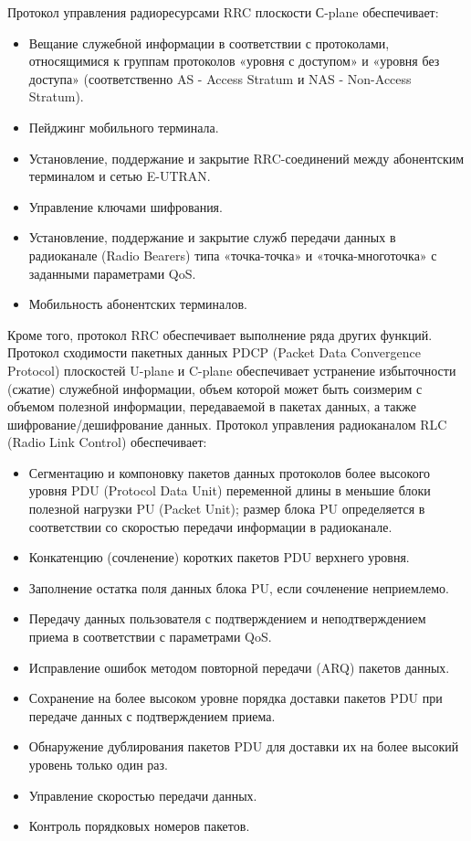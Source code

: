 Протокол управления радиоресурсами RRC плоскости С-plane обеспечивает:
\begin{itemize}
  \item Вещание служебной информации в соответствии с протоколами, относящимися к группам протоколов «уровня с доступом» и «уровня без доступа» (соответственно AS - Access Stratum и NAS - Non-Access Stratum).
  \item Пейджинг мобильного терминала.
  \item Установление, поддержание и закрытие RRC-соединений между абонентским терминалом и сетью E-UTRAN.
  \item Управление ключами шифрования.
  \item Установление, поддержание и закрытие служб передачи данных в радиоканале (Radio Bearers) типа «точка-точка» и «точка-многоточка» с заданными параметрами QoS.
  \item Мобильность абонентских терминалов.
\end{itemize}
Кроме того, протокол RRC обеспечивает выполнение ряда других функций.
Протокол сходимости пакетных данных PDCP (Packet Data Convergence Protocol) плоскостей U-plane и C-plane обеспечивает устранение избыточности (сжатие) служебной информации, объем которой может быть соизмерим с объемом полезной информации, передаваемой в пакетах данных, а также шифрование/дешифрование данных.
Протокол управления радиоканалом RLC (Radio Link Control) обеспечивает:
\begin{itemize}
  \item Сегментацию и компоновку пакетов данных протоколов более высокого уровня PDU (Protocol Data Unit) переменной длины в меньшие блоки полезной нагрузки PU (Packet Unit); размер блока PU определяется в соответствии со скоростью передачи информации в радиоканале.
  \item Конкатенцию (сочленение) коротких пакетов PDU верхнего уровня.
  \item Заполнение остатка поля данных блока PU, если сочленение неприемлемо.
  \item Передачу данных пользователя с подтверждением и неподтверждением приема в соответствии с параметрами QoS.
  \item Исправление ошибок методом повторной передачи (ARQ) пакетов данных.
  \item Сохранение на более высоком уровне порядка доставки пакетов PDU при передаче данных с подтверждением приема.
  \item Обнаружение дублирования пакетов PDU для доставки их на более высокий уровень только один раз.
  \item Управление скоростью передачи данных.
  \item Контроль порядковых номеров пакетов.
\end{itemize}
